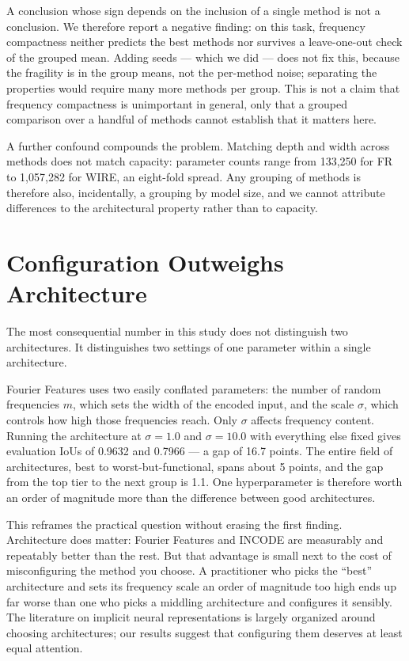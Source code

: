 A conclusion whose sign depends on the inclusion of a single method is not a conclusion. We therefore report a negative finding: on this task, frequency compactness neither predicts the best methods nor survives a leave-one-out check of the grouped mean. Adding seeds --- which we did --- does not fix this, because the fragility is in the group means, not the per-method noise; separating the properties would require many more methods per group. This is not a claim that frequency compactness is unimportant in general, only that a grouped comparison over a handful of methods cannot establish that it matters here.

A further confound compounds the problem. Matching depth and width across methods does not match capacity: parameter counts range from 133{,}250 for FR to 1{,}057{,}282 for WIRE, an eight-fold spread. Any grouping of methods is therefore also, incidentally, a grouping by model size, and we cannot attribute differences to the architectural property rather than to capacity.

\section{Configuration Outweighs Architecture}
\label{sec:config}

The most consequential number in this study does not distinguish two architectures. It distinguishes two settings of one parameter within a single architecture.

Fourier Features uses two easily conflated parameters: the number of random frequencies $m$, which sets the width of the encoded input, and the scale $\sigma$, which controls how high those frequencies reach. Only $\sigma$ affects frequency content. Running the architecture at $\sigma = 1.0$ and $\sigma = 10.0$ with everything else fixed gives evaluation IoUs of 0.9632 and 0.7966 --- a gap of 16.7 points. The entire field of architectures, best to worst-but-functional, spans about 5 points, and the gap from the top tier to the next group is 1.1. One hyperparameter is therefore worth an order of magnitude more than the difference between good architectures.

This reframes the practical question without erasing the first finding. Architecture does matter: Fourier Features and INCODE are measurably and repeatably better than the rest. But that advantage is small next to the cost of misconfiguring the method you choose. A practitioner who picks the ``best'' architecture and sets its frequency scale an order of magnitude too high ends up far worse than one who picks a middling architecture and configures it sensibly. The literature on implicit neural representations is largely organized around choosing architectures; our results suggest that configuring them deserves at least equal attention.

